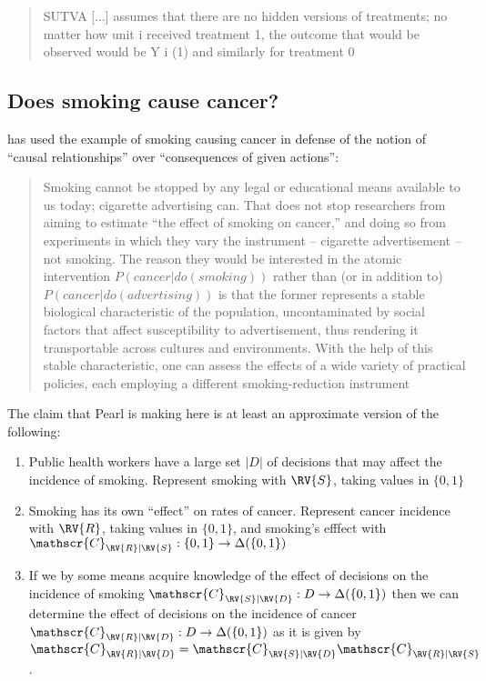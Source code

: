 \begin{quote}
 SUTVA [...] assumes that there are no hidden versions of treatments; no matter how unit i received treatment 1, the outcome that would be observed would be Y i (1) and similarly for treatment 0 \citep{rubin_causal_2005}
\end{quote}

\subsection{Does smoking cause cancer?}

\citet{pearl_does_2018} has used the example of smoking causing cancer in defense of the notion of ``causal relationships'' over ``consequences of given actions'':

\begin{quote}
Smoking cannot be stopped by any legal or educational means available to us today; cigarette advertising can. That does not stop researchers from aiming to estimate “the effect of smoking on cancer,” and doing so from experiments in which they vary the instrument -- cigarette advertisement -- not smoking.  The reason they would be interested in the atomic intervention $P(cancer|do(smoking))$ rather than (or in addition to) $P(cancer|do(advertising))$ is that the former represents a stable biological characteristic of the population, uncontaminated by social factors that affect susceptibility to advertisement, thus rendering it transportable across cultures and environments. With the help of this stable characteristic, one can assess the effects of a wide variety of practical policies, each employing a different smoking-reduction instrument
\end{quote}

The claim that Pearl is making here is at least an approximate version of the following:
\begin{enumerate}
	\item Public health workers have a large set $|D|$ of decisions that may affect the incidence of smoking. Represent smoking with $\RV{S}$, taking values in $\{0,1\}$
	\item Smoking has its own ``effect'' on rates of cancer. Represent cancer incidence with $\RV{R}$, taking values in $\{0,1\}$, and smoking's efffect with $\mathscr{C}_{\RV{R}|\RV{S}}:\{0,1\}\to \Delta(\{0,1\})$
	\item If we by some means acquire knowledge of the effect of decisions on the incidence of smoking $\mathscr{C}_{\RV{S}|\RV{D}}:D\to \Delta(\{0,1\})$ then we can determine the effect of decisions on the incidence of cancer $\mathscr{C}_{\RV{R}|\RV{D}}:D\to \Delta(\{0,1\})$ as it is given by $\mathscr{C}_{\RV{R}|\RV{D}}=\mathscr{C}_{\RV{S}|\RV{D}}\mathscr{C}_{\RV{R}|\RV{S}}$.
\end{enumerate}

